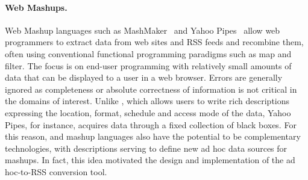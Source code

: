
\paragraph*{Web Mashups.}
Web Mashup languages such as MashMaker~\cite{ennals+:mashmaker} 
and Yahoo Pipes~\cite{yahoopipes} allow web programmers to
extract data from web sites and RSS feeds and recombine them,
often using conventional functional programming paradigms such as
map and filter.  The focus is on end-user programming with relatively
small amounts of data that can be displayed to a user in a web
browser. Errors are generally ignored as completeness or absolute 
correctness of information is not critical in the domains of interest.
Unlike \padsd{}, which allows users to write rich descriptions
expressing the location, format, schedule and access mode of the data, 
Yahoo Pipes, for instance, acquires data through a fixed collection of 
black boxes.  For this reason, \padsd{} and mashup languages also have the 
potential to be complementary technologies, with \padsd{} descriptions
serving to define new ad hoc data sources for mashups.  In fact, this
idea motivated the design and implementation of the \padsd{} ad
hoc-to-RSS conversion tool. 

